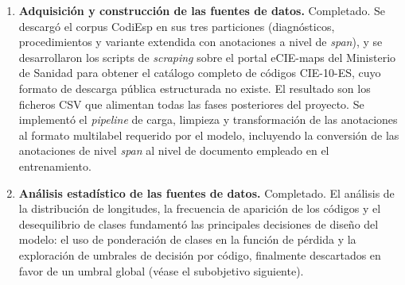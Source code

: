 \begin{enumerate}
 \item \textbf{Adquisición y construcción de las fuentes de datos.} Completado. Se descargó el corpus CodiEsp en sus tres particiones (diagnósticos, procedimientos y variante extendida con anotaciones a nivel de \emph{span}), y se desarrollaron los scripts de \emph{scraping} sobre el portal eCIE-maps del Ministerio de Sanidad para obtener el catálogo completo de códigos CIE-10-ES, cuyo formato de descarga pública estructurada no existe. El resultado son los ficheros CSV que alimentan todas las fases posteriores del proyecto. Se implementó el \emph{pipeline} de carga, limpieza y transformación de las anotaciones al formato multilabel requerido por el modelo, incluyendo la conversión de las anotaciones de nivel \emph{span} al nivel de documento empleado en el entrenamiento.


 \item \textbf{Análisis estadístico de las fuentes de datos.} Completado. El análisis de la distribución de longitudes, la frecuencia de aparición de los códigos y el desequilibrio de clases fundamentó las principales decisiones de diseño del modelo: el uso de ponderación de clases en la función de pérdida y la exploración de umbrales de decisión por código, finalmente descartados en favor de un umbral global (véase el subobjetivo siguiente).


\end{enumerate}
